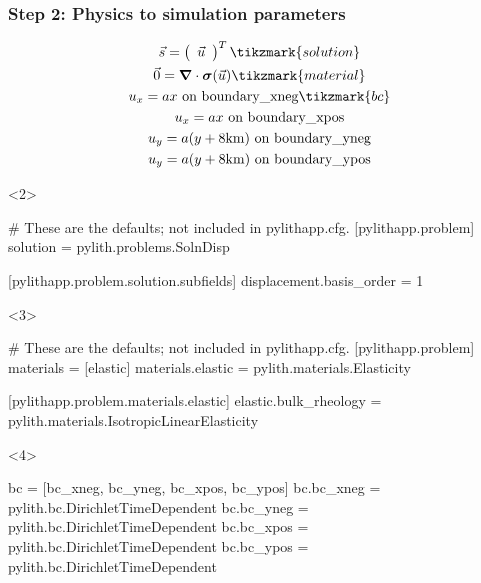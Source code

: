 \documentclass[aspectratio=169]{beamer}
\begin{document}
\begin{frame}[t,fragile]
  \frametitle{Step 2: Physics to simulation parameters}
  \summary{}

  \begin{minipage}[t]{0.35\textwidth}
    {\scriptsize
    \begin{gather*}
      \vec{s} = \left(\begin{array}{c} \vec{u} \end{array}\right)^T \tikzmark{solution}\\
      \vec{0} = \boldsymbol{\nabla} \cdot \boldsymbol{\sigma}(\vec{u}) \tikzmark{material}\\
      u_x = ax \text{ on boundary\_xneg} \tikzmark{bc}\\
      u_x = ax \text{ on boundary\_xpos} \\
      u_y = a(y+8\mathrm{km}) \text{ on boundary\_yneg} \\
      u_y = a(y+8\mathrm{km}) \text{ on boundary\_ypos}
    \end{gather*}}
  \end{minipage}
  \hfill
  \begin{minipage}[t]{0.60\textwidth}
    \begin{onlyenv}<2>
      \begin{cfgcode}
        # These are the defaults; not included in pylithapp.cfg.
        [pylithapp.problem]
        solution = pylith.problems.SolnDisp
        
        [pylithapp.problem.solution.subfields]
        displacement.basis_order = 1
      \end{cfgcode}
    \end{onlyenv}
    \begin{onlyenv}<3>
      \begin{cfgcode}
        # These are the defaults; not included in pylithapp.cfg.
        [pylithapp.problem]
        materials = [elastic]
        materials.elastic = pylith.materials.Elasticity

        [pylithapp.problem.materials.elastic]
        elastic.bulk_rheology = pylith.materials.IsotropicLinearElasticity
      \end{cfgcode}
    \end{onlyenv}
    \begin{onlyenv}<4>
      \begin{cfgcode}
        bc = [bc_xneg, bc_yneg, bc_xpos, bc_ypos]
        bc.bc_xneg = pylith.bc.DirichletTimeDependent
        bc.bc_yneg = pylith.bc.DirichletTimeDependent
        bc.bc_xpos = pylith.bc.DirichletTimeDependent
        bc.bc_ypos = pylith.bc.DirichletTimeDependent
        

\end{cfgcode}
\end{onlyenv}
\end{minipage}
\end{frame}
\end{document}
